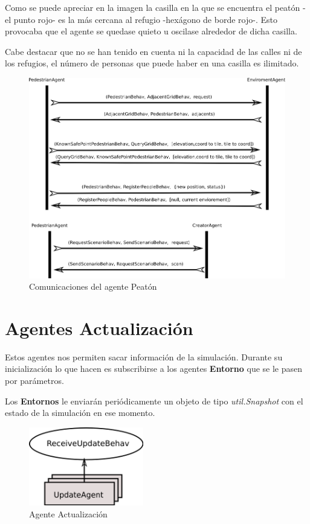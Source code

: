 Como se puede apreciar en la imagen la casilla en la que se encuentra el peatón
-el punto rojo- es la más cercana al refugio -hexágono de borde rojo-. Esto
provocaba que el agente se quedase quieto u oscilase alrededor de dicha casilla.

Cabe destacar que no se han tenido en cuenta ni la capacidad de las calles ni
de los refugios, el número de personas que puede haber en una casilla es
ilimitado.

\begin{figure}[H]
 \centering
 \includegraphics[width=135mm]{figuras/cap5/com_pedestrian.png}
 \caption{Comunicaciones del agente Peatón}
\end{figure}

\section*{Agentes Actualización}

Estos agentes nos permiten sacar información de la simulación. Durante su
inicialización lo que hacen es subscribirse a los agentes {\bf Entorno} que se
le pasen por parámetros.

Los {\bf Entornos} le enviarán periódicamente un objeto de tipo {\em
util.Snapshot} con el estado de la simulación en ese momento.

\begin{figure}[H]
 \centering
 \includegraphics[width=50mm]{figuras/cap5/ag_update.png}
 \caption{Agente Actualización}
\end{figure}

